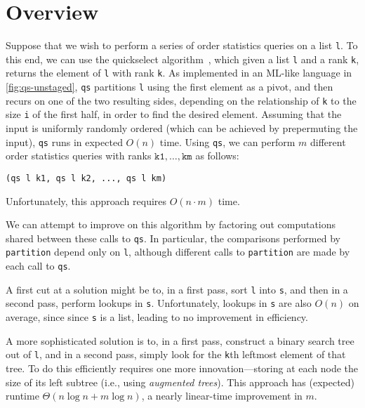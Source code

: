 
\section{Overview}
\label{sec:overview}

\begin{abstrsyn}



Suppose that we wish to perform a series of order statistics queries
on a list \texttt{l}. To this end, we can use the quickselect
algorithm~\cite{Hoare:1961}, which given a list \texttt{l} and a rank
\texttt{k}, returns the element of \texttt{l} with rank \texttt{k}.
As implemented in an ML-like language in \ref{fig:qs-unstaged},
\texttt{qs} partitions \texttt{l} using the first element as
a pivot, and then recurs on one of the two resulting sides, depending on
the relationship of \texttt{k} to the size \texttt{i} of the first half, in
order to find the desired element.  Assuming that the input is uniformly
randomly ordered (which can be achieved by prepermuting the input), \texttt{qs}
runs in expected $O(n)$ time.
%
Using \texttt{qs}, we can perform $m$ different order statistics queries with
ranks $\mathtt{k1},\dots,\mathtt{km}$ as follows:
%
\begin{lstlisting}
(qs l k1, qs l k2, ..., qs l km)
\end{lstlisting}
%
Unfortunately, this approach requires $O(n \cdot m)$ time.

We can attempt to improve on this algorithm by factoring out computations shared
between these calls to \texttt{qs}. In particular, the comparisons performed by
\texttt{partition} depend only on \texttt{l}, although different calls to
\texttt{partition} are made by each call to \texttt{qs}.

A first cut at a solution might be to, in a first pass, sort \texttt{l} into
\texttt{s}, and then in a second pass, perform lookups in \texttt{s}.
Unfortunately, lookups in \texttt{s} are also $O(n)$ on average, since since
\texttt{s} is a list, leading to no improvement in efficiency.  

A more sophisticated solution is to, in a first pass, construct a binary search
tree out of \texttt{l}, and in a second pass, simply look for the \texttt{k}th
leftmost element of that tree. To do this efficiently requires one more
innovation---storing at each node the size of its left subtree (i.e., using
\emph{augmented trees}). This approach has (expected) runtime $\Theta(n\log{n} +
m\log{n})$, a nearly linear-time improvement in $m$.


\end{abstrsyn}
